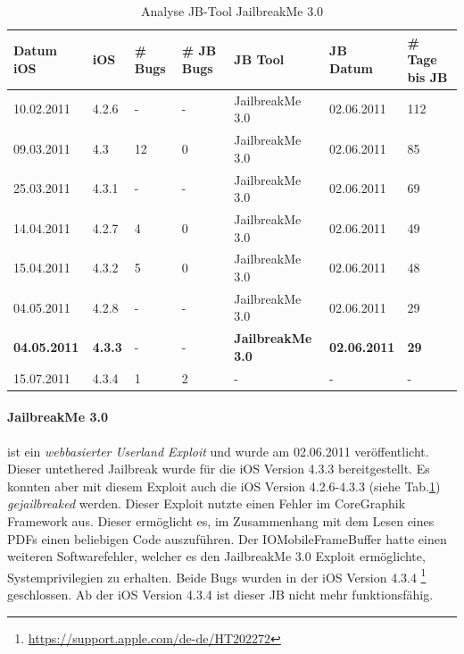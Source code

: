 \begin{table}[hp!]
    \begin{center}
        \begin{tabular}{| p{20mm} | p{12mm} | p{17mm} | p{12mm} | p{32mm} | p{22mm} | p{15mm} |} \hline
             \textbf{Datum iOS} & \textbf{iOS} & \textbf{\# Bugs} & \textbf{\# JB Bugs} & \textbf{JB Tool} & \textbf{JB Datum} & \textbf{\# Tage bis JB} \\ \hline 
            10.02.2011 & 4.2.6 &  - & -  & JailbreakMe 3.0 & 02.06.2011 & 112 \\ \hline
             09.03.2011 & 4.3 & 12 & 0 & JailbreakMe 3.0 &	02.06.2011 & 85 \\ \hline
             25.03.2011 & 4.3.1 &  - & - & JailbreakMe 3.0 & 02.06.2011 & 69 \\ \hline
            14.04.2011 & 4.2.7 &  4 & 0 & JailbreakMe 3.0 & 02.06.2011 & 49 \\ \hline
             15.04.2011 & 4.3.2 & 5 & 0 & JailbreakMe 3.0 & 02.06.2011 & 48 \\ \hline
             04.05.2011 & 4.2.8 &  - & - & JailbreakMe 3.0 & 02.06.2011 & 29 \\ \hline
            \textbf{04.05.2011} & \textbf{4.3.3} &  - & -  & \textbf{JailbreakMe 3.0} & \textbf{02.06.2011} & \textbf{29} \\ \hline
            15.07.2011 & 4.3.4 &  1 & 2	 & - & - & - \\ \hline
        \end{tabular} 
        \caption{Analyse JB-Tool JailbreakMe 3.0 \protect\footnotemark }         
        \label{tab:AnalyseJailbreakMe3.0}
    \end{center}
\end{table}

\paragraph{JailbreakMe 3.0} ist ein \textit{\glqq webbasierter Userland Exploit\grqq{}} und wurde am 02.06.2011 veröffentlicht. Dieser untethered Jailbreak wurde für die iOS Version 4.3.3 bereitgestellt. Es konnten aber mit diesem Exploit auch die iOS Version 4.2.6-4.3.3 (siehe Tab.\ref{tab:AnalyseJailbreakMe3.0})  \textit{\glqq gejailbreaked\grqq{}} werden. 
Dieser Exploit nutzte einen Fehler im CoreGraphik Framework aus. Dieser ermöglicht es, im Zusammenhang mit dem Lesen eines PDFs einen beliebigen Code auszuführen. Der IOMobileFrameBuffer hatte einen weiteren Softwarefehler, welcher es den JailbreakMe 3.0 Exploit ermöglichte, Systemprivilegien zu erhalten. Beide Bugs wurden in der iOS Version 4.3.4 \footnote{\label{foot:iOS4.3.4}{\url{https://support.apple.com/de-de/HT202272}}} geschlossen. Ab der iOS Version 4.3.4 ist dieser JB nicht mehr funktionsfähig.
 
